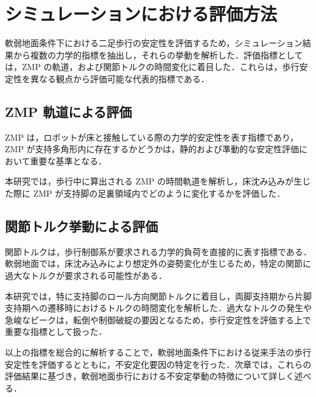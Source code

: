 \section{シミュレーションにおける評価方法}
\label{sec:evaluation_method}

軟弱地面条件下における二足歩行の安定性を評価するため，シミュレーション結果から複数の力学的指標を抽出し，それらの挙動を解析した．評価指標としては，ZMP の軌道，および関節トルクの時間変化に着目した．これらは，歩行安定性を異なる観点から評価可能な代表的指標である．

\subsection{ZMP 軌道による評価}
\label{subsec:evaluation_zmp}

ZMP は，ロボットが床と接触している際の力学的安定性を表す指標であり，ZMP が支持多角形内に存在するかどうかは，静的および準動的な安定性評価において重要な基準となる．

本研究では，歩行中に算出される ZMP の時間軌道を解析し，床沈み込みが生じた際に ZMP が支持脚の足裏領域内でどのように変化するかを評価した．

\subsection{関節トルク挙動による評価}
\label{subsec:evaluation_torque}

関節トルクは，歩行制御系が要求される力学的負荷を直接的に表す指標である．軟弱地面では，床沈み込みにより想定外の姿勢変化が生じるため，特定の関節に過大なトルクが要求される可能性がある．

本研究では，特に支持脚のロール方向関節トルクに着目し，両脚支持期から片脚支持期への遷移時におけるトルクの時間変化を解析した．過大なトルクの発生や急峻なピークは，転倒や制御破綻の要因となるため，歩行安定性を評価する上で重要な指標として扱った．

以上の指標を総合的に解析することで，軟弱地面条件下における従来手法の歩行安定性を評価するとともに，不安定化要因の特定を行った．次章では，これらの評価結果に基づき，軟弱地面歩行における不安定挙動の特徴について詳しく述べる．
